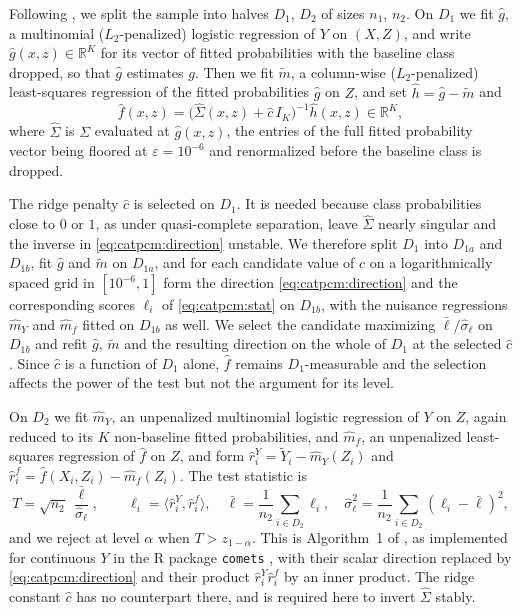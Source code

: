 \documentclass[twoside,11pt]{article}
\begin{document}
Following \citet{lundborg2024projected}, we split the sample into halves $D_1$, $D_2$ of sizes $n_1$, $n_2$. On $D_1$ we fit $\hat{g}$, a multinomial ($L_2$-penalized) logistic regression of $Y$ on $(X,Z)$, and write $\hat{g}(x,z) \in \mathbb{R}^K$ for its vector of fitted probabilities with the baseline class dropped, so that $\hat{g}$ estimates $g$. Then we fit $\tilde{m}$, a column-wise ($L_2$-penalized) least-squares regression of the fitted probabilities $\hat{g}$ on $Z$, and set $\hat{h} = \hat{g} - \tilde{m}$ and
\begin{equation}
  \label{eq:catpcm:direction}
  \hat{f}(x,z) = \bigl(\hat{\Sigma}(x,z) + \hat{c}\, I_K\bigr)^{-1} \hat{h}(x,z) \in \mathbb{R}^{K},
\end{equation}
where $\hat{\Sigma}$ is $\Sigma$ evaluated at $\hat{g}(x,z)$, the entries of the full fitted probability vector being floored at $\varepsilon = 10^{-6}$ and renormalized before the baseline class is dropped.

The ridge penalty $\hat{c}$ is selected on $D_1$. It is needed because class probabilities close to $0$ or $1$, as under quasi-complete separation, leave $\hat{\Sigma}$ nearly singular and the inverse in \eqref{eq:catpcm:direction} unstable. We therefore split $D_1$ into $D_{1a}$ and $D_{1b}$, fit $\hat{g}$ and $\tilde{m}$ on $D_{1a}$, and for each candidate value of $c$ on a logarithmically spaced grid in $[10^{-6}, 1]$ form the direction \eqref{eq:catpcm:direction} and the corresponding scores $\ell_i$ of \eqref{eq:catpcm:stat} on $D_{1b}$, with the nuisance regressions $\hat{m}_Y$ and $\hat{m}_f$ fitted on $D_{1b}$ as well. We select the candidate maximizing $\bar{\ell}/\hat{\sigma}_\ell$ on $D_{1b}$ and refit $\hat{g}$, $\tilde{m}$ and the resulting direction on the whole of $D_1$ at the selected $\hat{c}$. Since $\hat{c}$ is a function of $D_1$ alone, $\hat{f}$ remains $D_1$-measurable and the selection affects the power of the test but not the argument for its level.

On $D_2$ we fit $\hat{m}_Y$, an unpenalized multinomial logistic regression of $Y$ on $Z$, again reduced to its $K$ non-baseline fitted probabilities, and $\hat{m}_f$, an unpenalized least-squares regression of $\hat{f}$ on $Z$, and form $\hat{r}^Y_i = \tilde{Y}_i - \hat{m}_Y(Z_i)$ and $\hat{r}^f_i = \hat{f}(X_i,Z_i) - \hat{m}_f(Z_i)$. The test statistic is
\begin{equation}
  \label{eq:catpcm:stat}
  T = \sqrt{n_2}\,\frac{\bar{\ell}}{\hat{\sigma}_\ell}, \qquad
  \ell_i = \langle \hat{r}^Y_i, \hat{r}^f_i \rangle, \quad
  \bar{\ell} = \frac{1}{n_2}\sum_{i \in D_2} \ell_i, \quad
  \hat{\sigma}_\ell^2 = \frac{1}{n_2}\sum_{i \in D_2} (\ell_i - \bar{\ell})^2,
\end{equation}
and we reject at level $\alpha$ when $T > z_{1-\alpha}$. This is Algorithm~1 of \citet{lundborg2024projected}, as implemented for continuous $Y$ in the \textsf{R} package
\texttt{comets} \citep{kook2024algorithm}, with their scalar direction replaced by \eqref{eq:catpcm:direction} and their product $\hat{r}^Y_i \hat{r}^f_i$ by an inner product. The ridge constant $\hat{c}$ has no counterpart there, and is required here to invert $\hat{\Sigma}$ stably.
\end{document}
